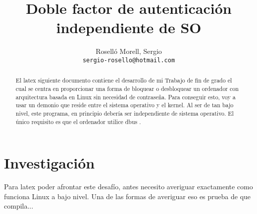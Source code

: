\documentclass[titlepage]{article}
\title{Doble factor de autenticación independiente de SO}
\author{Roselló Morell, Sergio\\
\texttt{sergio-rosello@hotmail.com}}
\begin{document}
\maketitle
\tableofcontents

\begin{abstract}
El \Gls{latex} siguiente documento contiene el desarrollo de mi Trabajo de fin de grado el cual se centra en proporcionar una forma de bloquear o desbloquear un ordenador con arquitectura basada en Linux sin necesidad de contraseña. Para conseguir esto, voy a usar un demonio que reside entre el sistema operativo y el kernel. Al ser de tan bajo nivel, este programa, en principio debería ser independiente de sistema operativo. El único requisito es que el ordenador utilice dbus \cite{dbus}. 
\end{abstract}
\section{Investigación}
Para \Gls{latex} poder afrontar este desafío, antes necesito averiguar exactamente como funciona Linux a bajo nivel. Una de las formas de averiguar eso es prueba de que compila...
\clearpage
\printglossaries
\clearpage
\printbibliography[heading=bibintoc,title={Bibliografía}]
\end{document}
